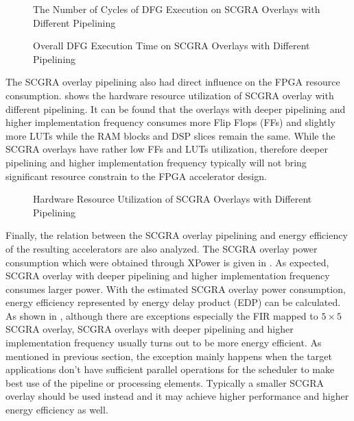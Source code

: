 \begin{figure}[tb]
\centering
{}
\hfill
{}
\caption{The Number of Cycles of DFG Execution on SCGRA Overlays with Different Pipelining}
\label{fig:pipeline-cycle-cnt}
\end{figure}

\begin{figure}[tb]
\centering
{}
\hfill
{}
\caption{Overall DFG Execution Time on SCGRA Overlays with Different Pipelining}
\label{fig:pipeline-run-time}
\end{figure}

The SCGRA overlay pipelining also had direct influence on the FPGA resource consumption.  shows the hardware resource utilization of SCGRA overlay with different pipelining. It can be found that the overlays with deeper pipelining and higher implementation frequency consumes more Flip Flops (FFs) and slightly more LUTs while the RAM blocks and DSP slices remain the same. While the SCGRA overlays have rather low FFs and LUTs utilization, therefore deeper pipelining and higher implementation frequency typically will not bring significant resource constrain to the FPGA accelerator design. 

\begin{figure}[htb]
\caption{Hardware Resource Utilization of SCGRA Overlays with Different Pipelining}
\label{fig:pipeline-resource}
\end{figure} 

Finally, the relation between the SCGRA overlay pipelining and energy efficiency of the resulting accelerators are also analyzed. The SCGRA overlay power consumption which were obtained through XPower is given in . As expected, SCGRA overlay with deeper pipelining and higher implementation frequency consumes larger power. With the estimated SCGRA overlay power consumption, energy efficiency represented by energy delay product (EDP) can be calculated. As shown in , although there are exceptions especially the FIR mapped to $5 \times 5$ SCGRA overlay, SCGRA overlays with deeper pipelining and higher implementation frequency usually turns out to be more energy efficient. As mentioned in previous section, the exception mainly happens when the target applications don't have sufficient parallel operations for the scheduler to make best use of the pipeline or processing elements. Typically a smaller SCGRA overlay should be used instead and it may achieve higher performance and higher energy efficiency as well.

